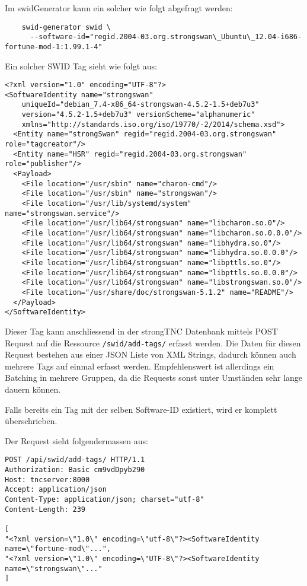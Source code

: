 \documentclass[10pt,a4paper]{scrartcl}
\begin{document}
Im swidGenerator kann ein solcher wie folgt abgefragt werden:

\begin{small}\begin{verbatim}
	swid-generator swid \
	  --software-id="regid.2004-03.org.strongswan\_Ubuntu\_12.04-i686-fortune-mod-1:1.99.1-4"
\end{verbatim}\end{small}

Ein solcher SWID Tag sieht wie folgt aus:

\begin{small}
\begin{verbatim}
<?xml version="1.0" encoding="UTF-8"?>
<SoftwareIdentity name="strongswan" 
	uniqueId="debian_7.4-x86_64-strongswan-4.5.2-1.5+deb7u3" 
	version="4.5.2-1.5+deb7u3" versionScheme="alphanumeric" 
	xmlns="http://standards.iso.org/iso/19770/-2/2014/schema.xsd">
  <Entity name="strongSwan" regid="regid.2004-03.org.strongswan" role="tagcreator"/>
  <Entity name="HSR" regid="regid.2004-03.org.strongswan" role="publisher"/>
  <Payload>
    <File location="/usr/sbin" name="charon-cmd"/>
    <File location="/usr/sbin" name="strongswan"/>
    <File location="/usr/lib/systemd/system" name="strongswan.service"/>
    <File location="/usr/lib64/strongswan" name="libcharon.so.0"/>
    <File location="/usr/lib64/strongswan" name="libcharon.so.0.0.0"/>
    <File location="/usr/lib64/strongswan" name="libhydra.so.0"/>
    <File location="/usr/lib64/strongswan" name="libhydra.so.0.0.0"/>
    <File location="/usr/lib64/strongswan" name="libpttls.so.0"/>
    <File location="/usr/lib64/strongswan" name="libpttls.so.0.0.0"/>
    <File location="/usr/lib64/strongswan" name="libstrongswan.so.0"/>
    <File location="/usr/share/doc/strongswan-5.1.2" name="README"/>
  </Payload>
</SoftwareIdentity>
\end{verbatim}
\end{small}

Dieser Tag kann anschliessend in der strongTNC Datenbank mittels POST Request
auf die Ressource \texttt{/swid/add-tags/} erfasst werden. Die Daten für diesen
Request bestehen aus einer JSON Liste von XML Strings, dadurch können auch
mehrere Tags auf einmal erfasst werden. Empfehlenswert ist allerdings ein
Batching in mehrere Gruppen, da die Requests sonst unter Umständen sehr lange
dauern können. 

Falls bereits ein Tag mit der selben Software-ID existiert, wird er komplett
überschrieben.

\pagebreak
Der Request sieht folgendermassen aus:
\begin{small}\begin{lstlisting}
POST /api/swid/add-tags/ HTTP/1.1
Authorization: Basic cm9vdDpyb290
Host: tncserver:8000
Accept: application/json
Content-Type: application/json; charset="utf-8"
Content-Length: 239

[
"<?xml version=\"1.0\" encoding=\"utf-8\"?><SoftwareIdentity name=\"fortune-mod\"...",
"<?xml version=\"1.0\" encoding=\"UTF-8\"?><SoftwareIdentity name=\"strongswan\"..."
]
\end{lstlisting}\end{small}
\end{document}
